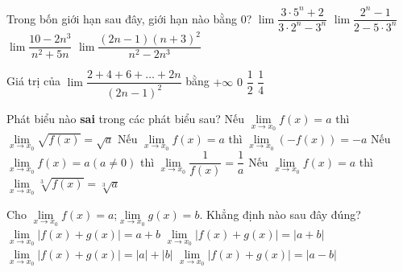 \begin{ex}%
		Trong bốn giới hạn sau đây, giới hạn nào bằng $0$?
		\choice
		{$\lim \dfrac{{3\cdot 5}^n+2}{{3\cdot 2}^n-3^n}$ }
		{\True $\lim \dfrac{2^n-1}{2-{5\cdot3}^n}$ }
		{$\lim \dfrac{10-2n^3}{n^2+5n}$}
		{$\lim \dfrac{(2n-1){(n+3)}^2}{n^2-2n^3}$}
	\end{ex}

\begin{ex}%
		Giá trị của $\lim \dfrac{2+4+6+\dots+2n}{{\left({2n-1}\right)}^2}$ bằng
		\choice
		{$+\infty $}
		{$0$}
		{$\dfrac{1}{2}$}
		{\True $\dfrac{1}{4}$}
	\end{ex}

\begin{ex}%
		Phát biểu nào \textbf{ sai} trong các phát biểu sau?
		\choice
		{\True Nếu $\displaystyle\lim\limits_{x\to x_0}f(x)=a$ thì $\displaystyle\lim\limits_{x\to x_0}\sqrt{f(x)}=\sqrt{a}$}
		{Nếu $\displaystyle\lim\limits_{x\to x_0}f(x)=a$ thì $\displaystyle\lim\limits_{x\to x_0}\left(-f(x)\right)=-a$}
		{Nếu $\displaystyle\lim\limits_{x\to x_0}f(x)=a (a\ne 0)$ thì $\displaystyle\lim\limits_{x\to x_0}\dfrac{1}{f(x)}=\dfrac{1}{a}$ }
		{Nếu $\displaystyle\lim\limits_{x\to x_0}f(x)=a$ thì $\displaystyle\lim\limits_{x\to x_0}\sqrt[3]{f(x)}=\sqrt[3]{a}$}
	\end{ex}

\begin{ex}%
		Cho $\displaystyle\lim\limits_{x\to x_0}f(x)=a$;$\displaystyle\lim\limits_{x\to x_0}g(x)=b$. Khẳng định nào sau đây đúng?
		\choice
		{$\displaystyle\lim\limits_{x\to x_0}\left|f(x)+g(x)\right|=a+b$}
		{\True $\displaystyle\lim\limits_{x\to x_0}\left|{f(x)+g(x)}\right|=\left|a+b\right|$}
		{$\displaystyle\lim\limits_{x\to x_0}\left|{f(x)+g(x)}\right|=\left|a\right|+\left|b\right|$}
		{$\displaystyle\lim\limits_{x\to x_0}\left|{f(x)+g(x)}\right|=\left|{a-b}\right|$}
	\end{ex}

